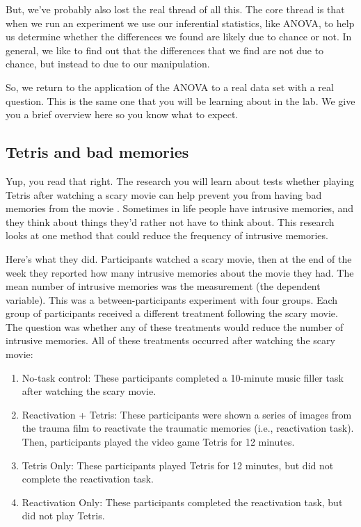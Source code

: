 \documentclass[
]{book}
\providecommand{\tightlist}{%
  \setlength{\itemsep}{0pt}\setlength{\parskip}{0pt}}
\begin{document}
But, we've probably also lost the real thread of all this. The core thread is that when we run an experiment we use our inferential statistics, like ANOVA, to help us determine whether the differences we found are likely due to chance or not. In general, we like to find out that the differences that we find are not due to chance, but instead to due to our manipulation.

So, we return to the application of the ANOVA to a real data set with a real question. This is the same one that you will be learning about in the lab. We give you a brief overview here so you know what to expect.

\subsection{Tetris and bad memories}\label{tetris-and-bad-memories}

Yup, you read that right. The research you will learn about tests whether playing Tetris after watching a scary movie can help prevent you from having bad memories from the movie \citep{james2015computer}. Sometimes in life people have intrusive memories, and they think about things they'd rather not have to think about. This research looks at one method that could reduce the frequency of intrusive memories.

Here's what they did. Participants watched a scary movie, then at the end of the week they reported how many intrusive memories about the movie they had. The mean number of intrusive memories was the measurement (the dependent variable). This was a between-participants experiment with four groups. Each group of participants received a different treatment following the scary movie. The question was whether any of these treatments would reduce the number of intrusive memories. All of these treatments occurred after watching the scary movie:

\begin{enumerate}
\def\labelenumi{\arabic{enumi}.}
\tightlist
\item
  No-task control: These participants completed a 10-minute music filler task after watching the scary movie.
\item
  Reactivation + Tetris: These participants were shown a series of images from the trauma film to reactivate the traumatic memories (i.e., reactivation task). Then, participants played the video game Tetris for 12 minutes.
\item
  Tetris Only: These participants played Tetris for 12 minutes, but did not complete the reactivation task.
\item
  Reactivation Only: These participants completed the reactivation task, but did not play Tetris.
\end{enumerate}
\end{document}
